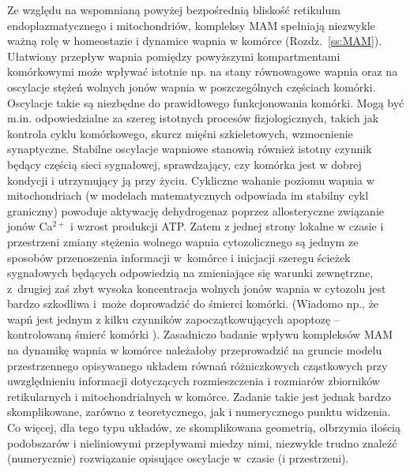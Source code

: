 Ze względu na wspomnianą powyżej bezpośrednią bliskość retikulum endoplazmatycznego i mitochondriów, kompleksy MAM spełniają niezwykle ważną rolę w homeostazie i dynamice wapnia w komórce (Rozdz.~\ref{ss:MAM}). Ułatwiony przepływ wapnia pomiędzy powyższymi kompartmentami komórkowymi może wpływać istotnie np. na stany równowagowe wapnia oraz na oscylacje stężeń wolnych jonów wapnia w poszczególnych częściach komórki. Oscylacje takie są niezbędne do prawidłowego funkcjonowania komórki. Mogą być m.in. odpowiedzialne za szereg istotnych procesów fizjologicznych, takich jak kontrola cyklu komórkowego, skurcz mięśni szkieletowych, wzmocnienie synaptyczne. Stabilne oscylacje wapniowe stanowią również istotny czynnik będący częścią sieci sygnałowej, sprawdzający, czy komórka jest w dobrej kondycji i utrzymujący ją przy życiu. Cykliczne wahanie poziomu wapnia w mitochondriach (w modelach matematycznych odpowiada im stabilny cykl graniczny) powoduje aktywację dehydrogenaz poprzez allosteryczne związanie jonów Ca$^{2+}$ i wzrost produkcji ATP. Zatem z jednej strony lokalne w czasie i przestrzeni zmiany stężenia wolnego wapnia cytozolicznego są jednym ze sposobów przenoszenia informacji w~komórce i inicjacji szeregu ścieżek sygnałowych będących odpowiedzią na zmieniające się warunki zewnętrzne, z~drugiej zaś zbyt wysoka koncentracja wolnych jonów wapnia w cytozolu jest bardzo szkodliwa i~może doprowadzić do śmierci komórki. (Wiadomo np., że wapń jest jednym z kilku czynników zapoczątkowujących apoptozę – kontrolowaną śmierć komórki \cite{Giorgi2012a}). Zasadniczo badanie wpływu kompleksów MAM na dynamikę wapnia w komórce należałoby przeprowadzić na gruncie modelu przestrzennego opisywanego układem równań różniczkowych cząstkowych przy uwzględnieniu informacji dotyczących rozmieszczenia i rozmiarów zbiorników retikularnych i mitochondrialnych w komórce. Zadanie takie jest jednak bardzo skomplikowane, zarówno z teoretycznego, jak i numerycznego punktu widzenia. Co więcej, dla tego typu układów, ze skomplikowana geometrią, olbrzymia ilością podobszarów i nieliniowymi przepływami miedzy nimi, niezwykle trudno znaleźć (numerycznie) rozwiązanie opisujące oscylacje w~czasie (i przestrzeni).

